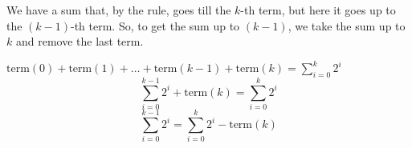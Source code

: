 \vspace{0.25cm}
We have a sum that, by the rule, goes till the \(k\)-th term, but here it goes up to the \((k-1)\)-th term.
So, to get the sum up to \((k-1)\), we take the sum up to \(k\) and remove the last term.

\vspace{0.75cm}

\hspace{6cm}\(\text{term}(0) + \text{term}(1) + \dots + \text{term}(k-1) + \text{term}(k) = \sum_{i=0}^{k} 2^i\)
\[\sum_{i=0}^{k-1} 2^i + \text{term}(k) = \sum_{i=0}^{k} 2^i \]
\[\sum_{i=0}^{k-1} 2^i = \sum_{i=0}^{k} 2^i - \text{term}(k)\]
